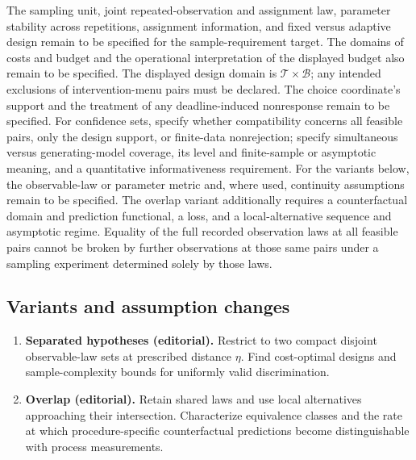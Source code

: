 \documentclass[11pt,a4paper]{article}
\begin{document}
The sampling unit, joint repeated-observation and assignment law, parameter stability across repetitions, assignment information, and fixed versus adaptive design remain to be specified for the sample-requirement target. The domains of costs and budget and the operational interpretation of the displayed budget also remain to be specified. The displayed design domain is \(\mathcal T\times\mathcal B\); any intended exclusions of intervention-menu pairs must be declared. The choice coordinate's support and the treatment of any deadline-induced nonresponse remain to be specified. For confidence sets, specify whether compatibility concerns all feasible pairs, only the design support, or finite-data nonrejection; specify simultaneous versus generating-model coverage, its level and finite-sample or asymptotic meaning, and a quantitative informativeness requirement. For the variants below, the observable-law or parameter metric and, where used, continuity assumptions remain to be specified. The overlap variant additionally requires a counterfactual domain and prediction functional, a loss, and a local-alternative sequence and asymptotic regime. Equality of the full recorded observation laws at all feasible pairs cannot be broken by further observations at those same pairs under a sampling experiment determined solely by those laws.
\subsection*{Variants and assumption changes}
\begin{enumerate}
\item \textbf{Separated hypotheses (editorial).} Restrict to two compact disjoint observable-law sets at prescribed distance \(\eta\). Find cost-optimal designs and sample-complexity bounds for uniformly valid discrimination.
\item \textbf{Overlap (editorial).} Retain shared laws and use local alternatives approaching their intersection. Characterize equivalence classes and the rate at which procedure-specific counterfactual predictions become distinguishable with process measurements.
\end{enumerate}
\end{document}

